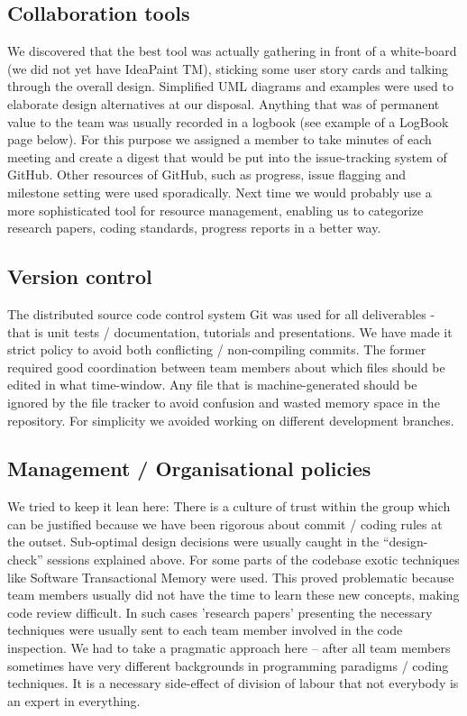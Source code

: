 \documentclass[11pt]{article}
\begin{document}
\subsection{Collaboration tools}
We discovered that the best tool was actually gathering in front of a
white-board (we did not yet have IdeaPaint TM), sticking some user story
cards and talking through the overall design. Simplified UML diagrams and
examples were used to elaborate design alternatives at our disposal. Anything
that was of permanent value to the team was usually recorded in a logbook
(see example of a LogBook page below). For this purpose we assigned a member
to take minutes of each meeting and create a digest that would be put into
the issue-tracking system of GitHub. Other resources of GitHub, such as
progress, issue flagging and milestone setting were used sporadically. Next 
time we would probably use a more sophisticated tool for resource management,
enabling us to categorize research papers, coding standards, progress 
reports in a better way.

\subsection{Version control}
The distributed source code control system Git was used for all deliverables -
that is unit tests / documentation, tutorials and presentations. We have made
it strict policy to avoid both conflicting / non-compiling commits. The former
required good coordination between team members about which files should be
edited in what time-window. Any file that is machine-generated should be
ignored by the file tracker to avoid confusion and wasted memory space in
the repository. For simplicity we avoided working on different development
branches. 

\subsection{Management / Organisational policies}
We tried to keep it lean here: There is a culture of trust within the group which
can be justified because we have been rigorous about commit / coding rules at the
outset. Sub-optimal design decisions were usually caught in the ``design-check'' sessions 
explained above. For some parts of the codebase exotic techniques like Software
Transactional Memory were used. This proved problematic because team members
usually did not have the time to learn these new concepts, making code review
difficult. In such cases 'research papers' presenting the necessary techniques
were usually sent to each team member involved in the code inspection. We had
to take a pragmatic approach here -- after all team members sometimes have very
different backgrounds in programming paradigms / coding techniques. It is a necessary
side-effect of division of labour that not everybody is an expert in everything.
\end{document}
